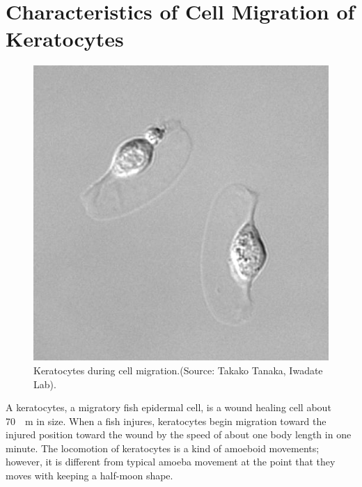 \documentclass[a4paper,12pt]{book}
\begin{document}
\section{Characteristics of Cell Migration of Keratocytes}
\begin{figure}[tbp]
\centering
\includegraphics[scale=0.4]{kera.eps}
\caption{Keratocytes during cell migration.(Source: Takako Tanaka, Iwadate Lab).}
\label{fig:kera}
\end{figure}

A keratocytes, a migratory fish epidermal cell, is a wound healing cell about \SI{70}{\mu m}  in size.
When a fish injures, keratocytes begin migration toward the injured position toward  the wound by the speed of about one body length in one minute.
The locomotion of keratocytes is a kind of amoeboid movements;
however, it is different from typical amoeba movement at the point that they moves  with keeping a half-moon shape. 
\end{document}
